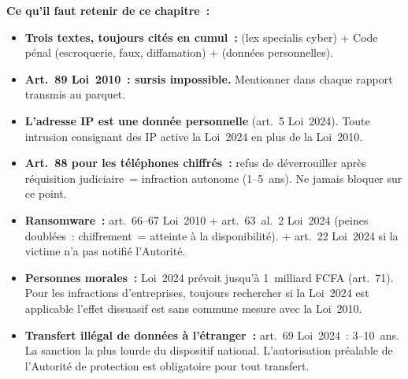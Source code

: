 \separateur

\begin{boxresume}
\textbf{Ce qu'il faut retenir de ce chapitre~:}
\begin{itemize}
    \item \textbf{Trois textes, toujours cités en cumul~:}
           (lex specialis cyber) + Code pénal
          (escroquerie, faux, diffamation) + 
          (données personnelles).

    \item \textbf{Art.~89 Loi~2010~: sursis impossible.} Mentionner
          dans chaque rapport transmis au parquet.

    \item \textbf{L'adresse IP est une donnée personnelle} (art.~5
          Loi~2024). Toute intrusion consignant des IP active la Loi~2024
          en plus de la Loi~2010.

    \item \textbf{Art.~88 pour les téléphones chiffrés~:} refus de
          déverrouiller après réquisition judiciaire~= infraction
          autonome (1--5~ans). Ne jamais bloquer sur ce point.

    \item \textbf{Ransomware~:} art.~66--67 Loi~2010 + art.~63~al.~2
          Loi~2024 (peines doublées~: chiffrement~= atteinte
          à la disponibilité). + art.~22 Loi~2024 si la victime
          n'a pas notifié l'Autorité.

    \item \textbf{Personnes morales~:} Loi~2024 prévoit jusqu'à
          1~milliard FCFA (art.~71). Pour les infractions d'entreprises,
          toujours rechercher si la Loi~2024 est applicable
          l'effet dissuasif est sans commune mesure avec la Loi~2010.

    \item \textbf{Transfert illégal de données à l'étranger~:}
          art.~69 Loi~2024~: 3--10~ans. La sanction la plus lourde
          du dispositif national. L'autorisation préalable de l'Autorité
          de protection est obligatoire pour tout transfert.
\end{itemize}
\end{boxresume}

\bigskip

